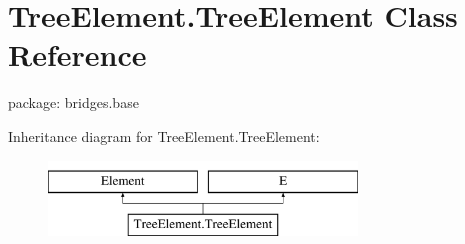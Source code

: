 \hypertarget{class_tree_element_1_1_tree_element}{}\section{Tree\+Element.\+Tree\+Element Class Reference}
\label{class_tree_element_1_1_tree_element}


package\+: bridges.\+base  


Inheritance diagram for Tree\+Element.\+Tree\+Element\+:\begin{figure}[H]
\begin{center}
\leavevmode
\includegraphics[height=2.000000cm]{class_tree_element_1_1_tree_element}
\end{center}
\end{figure}
